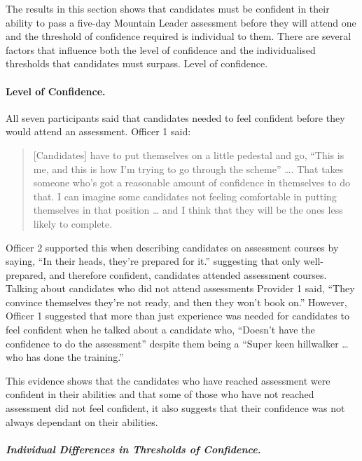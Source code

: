 \documentclass[
  12pt,
  a4paper,
]{book}
\begin{document}
The results in this section shows that candidates must be confident in their ability to pass a five-day Mountain Leader assessment before they will attend one and the threshold of confidence required is individual to them. There are several factors that influence both the level of confidence and the individualised thresholds that candidates must surpass. Level of confidence.

\hypertarget{level-of-confidence.}{%
\paragraph{Level of Confidence.}\label{level-of-confidence.}}

All seven participants said that candidates needed to feel confident before they would attend an assessment. Officer 1 said:

\begin{quote}
{[}Candidates{]} have to put themselves on a little pedestal and go, ``This is me, and this is how I'm trying to go through the scheme'' \ldots. That takes someone who's got a reasonable amount of confidence in themselves to do that. I can imagine some candidates not feeling comfortable in putting themselves in that position \ldots{} and I think that they will be the ones less likely to complete.
\end{quote}

Officer 2 supported this when describing candidates on assessment courses by saying, ``In their heads, they're prepared for it.'' suggesting that only well-prepared, and therefore confident, candidates attended assessment courses. Talking about candidates who did not attend assessments Provider 1 said, ``They convince themselves they're not ready, and then they won't book on.'' However, Officer 1 suggested that more than just experience was needed for candidates to feel confident when he talked about a candidate who, ``Doesn't have the confidence to do the assessment'' despite them being a ``Super keen hillwalker \ldots{} who has done the training.''

This evidence shows that the candidates who have reached assessment were confident in their abilities and that some of those who have not reached assessment did not feel confident, it also suggests that their confidence was not always dependant on their abilities.

\hypertarget{study1-ind-diff-conf}{%
\subparagraph{Individual Differences in Thresholds of Confidence.}\label{study1-ind-diff-conf}}
\end{document}
